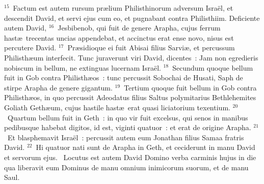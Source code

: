 ${}^{15}$~Factum est autem rursum pr\ae lium Philisthinorum adversum Isra\"el, et descendit David, et servi ejus cum eo, et pugnabant contra Philisthiim. Deficiente autem David,
${}^{16}$~Jesbibenob, qui fuit de genere Arapha, cujus ferrum hast\ae\ trecentas uncias appendebat, et accinctus erat ense novo, nisus est percutere David.
${}^{17}$~Pr\ae sidioque ei fuit Abisai filius Sarvi\ae , et percussum Philisth\ae um interfecit. Tunc juraverunt viri David, dicentes~: Jam non egredieris nobiscum in bellum, ne extinguas lucernam Isra\"el.
${}^{18}$~Secundum quoque bellum fuit in Gob contra Philisth\ae os~: tunc percussit Sobochai de Husati, Saph de stirpe Arapha de genere gigantum.
${}^{19}$~Tertium quoque fuit bellum in Gob contra Philisth\ae os, in quo percussit Adeodatus filius Saltus polymitarius Bethlehemites Goliath Geth\ae um, cujus hastile hast\ae\ erat quasi liciatorium texentium.
${}^{20}$~Quartum bellum fuit in Geth~: in quo vir fuit excelsus, qui senos in manibus pedibusque habebat digitos, id est, viginti quatuor~: et erat de origine Arapha.
${}^{21}$~Et blasphemavit Isra\"el~: percussit autem eum Jonathan filius Samaa fratris David.
${}^{22}$~Hi quatuor nati sunt de Arapha in Geth, et ceciderunt in manu David et servorum ejus.
~Locutus est autem David Domino verba carminis hujus in die qua liberavit eum Dominus de manu omnium inimicorum suorum, et de manu Saul.
